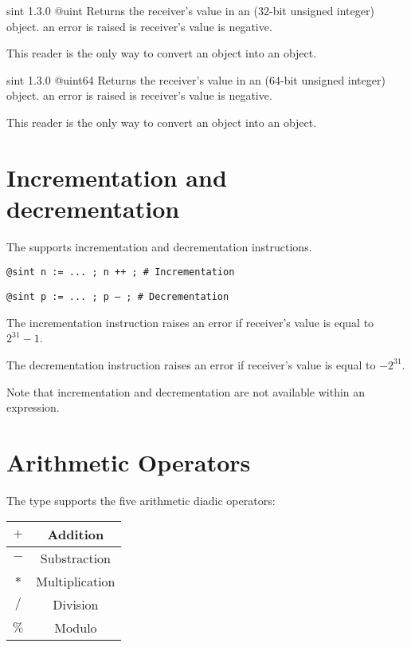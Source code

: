 {sint}
{1.3.0}
{@uint}
{Returns the receiver's value in an  (32-bit unsigned integer) object.}
{an error is raised is receiver's value is negative.}

This reader is the only way to convert an  object into an  object.




{sint}
{1.3.0}
{@uint64}
{Returns the receiver's value in an  (64-bit unsigned integer) object.}
{an error is raised is receiver's value is negative.}

This reader is the only way to convert an  object into an  object.





\section{Incrementation and decrementation}

The  supports incrementation and decrementation instructions.

\texttt{@sint n := ... ; n ++ ; \# Incrementation}

\texttt{@sint p := ... ; p -- ; \# Decrementation}\newline

The incrementation instruction raises an error if receiver's value is equal to $2^{31}-1$.\newline

The decrementation instruction raises an error if receiver's value is equal to $-2^{31}$.\newline

Note that incrementation and decrementation are not available within an expression.




\section{Arithmetic Operators}

The  type supports the five arithmetic diadic operators:\newline

\begin{tabular}{|c|c|}
\hline
$+$ & Addition \\
\hline
$-$ & Substraction \\
\hline
$*$ & Multiplication \\
\hline
$/$ & Division \\
\hline
$\%$ & Modulo \\
\hline
\end{tabular}

